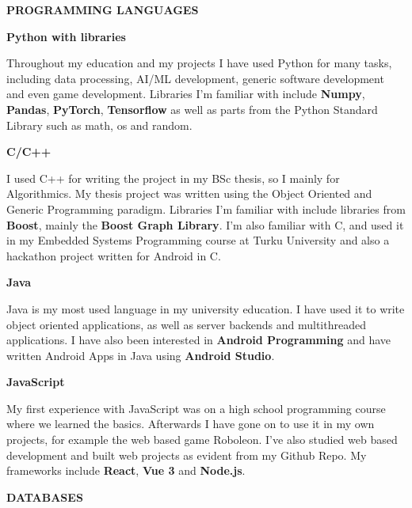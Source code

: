 \documentclass{article}
\begin{document}
\vspace{1cm}
\textbf{\LARGE PROGRAMMING LANGUAGES}
\vspace{0.5cm}

\textbf{\large Python with libraries}
\vspace{0.5cm}

\noindent Throughout my education and my projects I have used Python for many 
tasks, including data processing, AI/ML development, generic software 
development and even game development. Libraries I'm familiar with include 
\textbf{Numpy}, \textbf{Pandas}, \textbf{PyTorch}, \textbf{Tensorflow} as 
well as parts from the Python Standard Library such as math, os and random.

\vspace{0.5cm}
\textbf{\large C/C++}
\vspace{0.5cm}

\noindent I used C++ for writing the project in my BSc thesis, so I mainly for 
Algorithmics. My thesis project was written using the Object Oriented and 
Generic Programming paradigm. Libraries I'm familiar with include libraries 
from \textbf{Boost}, mainly the \textbf{Boost Graph Library}. I'm also 
familiar with C, and used it in my Embedded Systems Programming course at 
Turku University and also a hackathon project written for Android in C.

\vspace{0.5cm}
\textbf{\large Java}
\vspace{0.5cm}

\noindent Java is my most used language in my university education. I have 
used it to write object oriented applications, as well as server backends and 
multithreaded applications. I have also been interested in \textbf{Android 
Programming} and have written Android Apps in Java using \textbf{Android 
Studio}.

\vspace{0.5cm}
\textbf{\large JavaScript}
\vspace{0.5cm}

\noindent My first experience with JavaScript was on a high school programming 
course where we learned the basics. Afterwards I have gone on to use it in my 
own projects, for example the web based game Roboleon. I’ve also studied web 
based development and built web projects as evident from my Github Repo. My 
frameworks include \textbf{React}, \textbf{Vue 3} and \textbf{Node.js}.

\vspace{1cm}
\textbf{\LARGE DATABASES}
\vspace{0.5cm}
\end{document}
